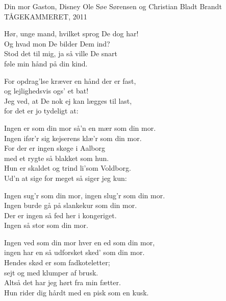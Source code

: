 \begin{song}{Din mor}
  {} %
  {Gaston, Disney} %
  {Ole Søe Sørensen og Christian Bladt Brandt} %
  {TÅGEKAMMERET, 2011} %
  {\NotCCLIed} %

  \begin{SBSection*}
    Hør, unge mand, hvilket sprog De dog har!\\
    Og hvad mon De bilder Dem ind?\\
    Stod det til mig, ja så ville De snart\\
    føle min hånd på din kind.
  \end{SBSection*}

  \begin{SBSection*}
    For opdrag’lse kræver en hånd der er fast,\\
    og lejlighedsvis ogs’ et bat!\\
    Jeg ved, at De nok ej kan lægges til last,\\
    for det er jo tydeligt at:
  \end{SBSection*}

  \begin{SBVerse}
    Ingen er som din mor så’n en mær som din mor.\\
    Ingen ifør’r sig kejserens klæ’r som din mor.\\
    For der er ingen skøge i Aalborg\\
    med et rygte så blakket som hun.\\
    Hun er skaldet og trind li’som Voldborg.\\
    Ud’n at sige for meget så siger jeg kun:
  \end{SBVerse}

  \begin{SBVerse}
    Ingen sug’r som din mor, ingen slug’r som din mor.\\
    Ingen burde gå på slankekur som din mor.\\
    Der er ingen så fed her i kongeriget.\\
    Ingen så stor som din mor.
  \end{SBVerse}

  \begin{SBVerse}
    Ingen ved som din mor hver en ed som din mor,\\
    ingen har en så udforsket sked’ som din mor.\\
    Hendes skød er som fadkoteletter;\\
    sejt og med klumper af brusk.\\
    Altså det har jeg hørt fra min fætter.\\
    Hun rider dig hårdt med en pisk som en kusk.
  \end{SBVerse}


\end{song}
